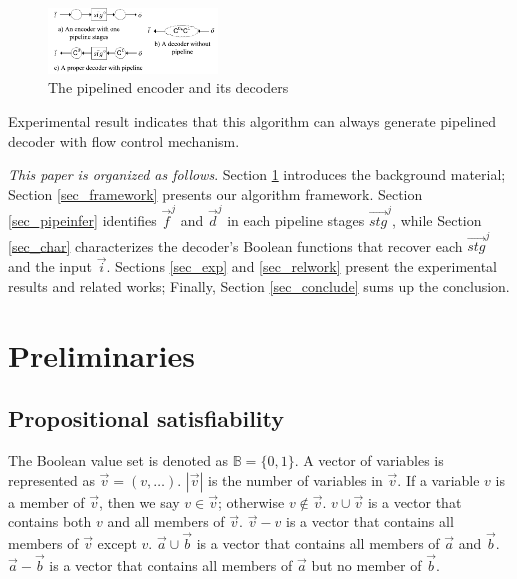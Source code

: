 \documentclass[conference]{IEEEtran}
\begin{document}
\begin{figure}[b]
\begin{center}
\includegraphics[width=0.4\textwidth]{pipeline}
\end{center}
\caption{The pipelined encoder and its decoders}
\label{fig_pipe}
\end{figure}


Experimental result indicates that this algorithm can always 
generate pipelined decoder with flow control mechanism.

\emph{This paper is organized as follows}.
Section \ref{sec_prem} introduces the background material;
Section \ref{sec_framework} presents our algorithm framework.
Section \ref{sec_pipeinfer} identifies $\vec{f}^j$ and $\vec{d}^j$ in each pipeline stages $\vec{stg}^j$,
while Section \ref{sec_char} characterizes the decoder's Boolean functions that recover each $\vec{stg}^j$ and the input $\vec{i}$.
Sections \ref{sec_exp} and \ref{sec_relwork} present the experimental results and related works;
Finally,
Section \ref{sec_conclude} sums up the conclusion.

\section{Preliminaries}\label{sec_prem}




\subsection{Propositional satisfiability}\label{subsec_SAT}
The Boolean value set is denoted as $\mathbb{B}=\{0,1\}$.
A vector of variables is represented as $\vec{v}=(v,\dots)$.
$|\vec{v}|$ is the number of variables in $\vec{v}$. 
If a variable $v$ is a member of $\vec{v}$,
then we say $v\in\vec{v}$;
otherwise $v\notin\vec{v}$.
$v\cup\vec{v}$ is a vector that contains both $v$ and all members of $\vec{v}$.
$\vec{v}-v$ is a vector that contains all members of $\vec{v}$ except $v$.
$\vec{a}\cup\vec{b}$ is a vector that contains  all members of $\vec{a}$ and $\vec{b}$.
$\vec{a}-\vec{b}$ is a vector that contains  all members of $\vec{a}$ but no member of $\vec{b}$.
\end{document}
